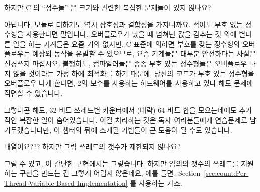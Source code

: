 \begin{enumerate}
\QuickQ{}
	하지만 C 의 ``정수들'' 은 크기와 관련한 복잡한 문제들이 있지 않나요?

\QuickA{}
	아닙니다, 모듈로 더하기도 역시 상호성과 결합성을 가지니까요.
	적어도 부호 없는 정수형을 사용한다면 말입니다.
	오버플로우가 났을 때 넘쳐난 값을 감추는 것 외에 별다른 일을 하는
	기계들은 요즘 거의 없지만, C 표준에 의하면 부호를 갖는 정수형의
	오버플로우는 예상외 동작을 유발할 수 있으므로, 요즘 기계들은 대부분
	안전하다는 사실은 신경쓰지 마십시오.
	불행히도, 컴파일러들은 종종 부호 있는 정수형들은 오버플로우 나지 않을
	것이라는 가정 하에 최적화를 하기 때문에, 당신의 코드가 부호 있는
	정수형을 오버플로우 나게 한다면, 2의 보수를 사용하는 하드웨어를
	사용하고 있다 해도 문제에 직면할 수 있습니다.

	그렇다곤 해도, 32-비트 쓰레드별 카운터에서 (대략) 64-비트 합을
	모으는데에도 추가적인 복잡한 일이 숨어있습니다.
	이걸 처리하는 것은 독자 여러분들에게 연습문제로 남겨두겠습니다만, 이
	챕터의 뒤에 소개될 기법들이 큰 도움이 될 수도 있습니다.

\QuickQ{}
	배열이요???
	하지만 그럼 쓰레드의 갯수가 제한되지 않나요?

\QuickA{}
	그럴 수 있고, 이 간단한 구현에서는 그렇습니다.
	하지만 임의의 갯수의 쓰레드를 지원하는 구현을 만드는 건 그렇게 어렵지
	않은데요, 예를 들면,
	Section~\ref{sec:count:Per-Thread-Variable-Based Implementation}
	  를 사용하는 거죠.

\end{enumerate}
